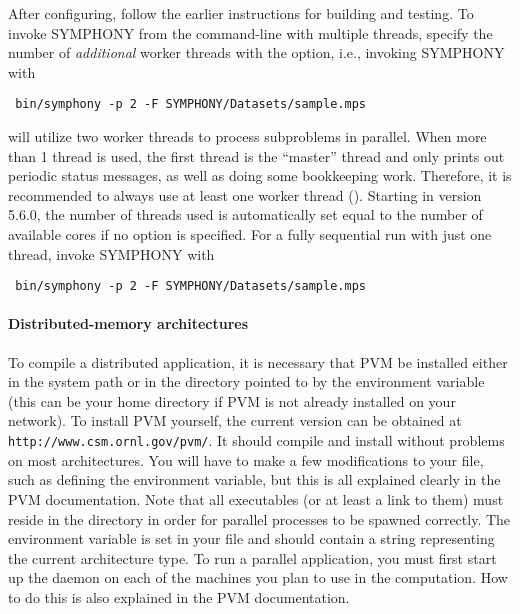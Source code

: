 After configuring, follow the earlier instructions for building and testing.
To invoke SYMPHONY from the command-line with multiple threads, specify the
number of \emph{additional} worker threads with the  option, i.e., 
invoking SYMPHONY with
{\color{brown}
\begin{verbatim}
 bin/symphony -p 2 -F SYMPHONY/Datasets/sample.mps
\end{verbatim}
}
will utilize two worker threads to process subproblems in parallel. 
When more than 1 thread is used, the first thread is the ``master''
thread and only prints out periodic status messages, as well as doing some
bookkeeping work. Therefore, it is recommended to always use at least one
worker thread (). Starting in version 5.6.0, the number of
threads used is automatically set equal to the number of available cores if no
option is specified. For a fully sequential run with just one thread, invoke
SYMPHONY with
{\color{brown}
\begin{verbatim}
 bin/symphony -p 2 -F SYMPHONY/Datasets/sample.mps
\end{verbatim}
}

\paragraph{Distributed-memory architectures}
\label{distributed-build}

\label{PVM}
To compile a distributed application, it is necessary that PVM be installed
either in the system path or in the directory pointed to by the environment
variable  (this can be your home directory if PVM is not
already installed on your network). To install PVM yourself, the current
version can be obtained at \texttt{
{http://www.csm.ornl.gov/pvm/}}. It should compile and install without
problems on most architectures. You will have to make a few modifications to
your  file, such as defining the  environment
variable, but this is all explained clearly in the PVM documentation. Note
that all executables (or at least a link to them) must reside in the
 directory in order for parallel processes
to be spawned correctly. The environment variable  is set in
your  file and should contain a string representing the current
architecture type. To run a parallel application, you must first start up the
daemon on each of the machines you plan to use in the computation. How to do
this is also explained in the PVM documentation.

